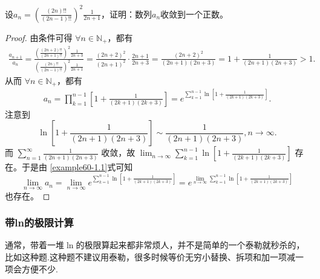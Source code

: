 \documentclass[lang=cn,newtx,10pt,scheme=chinese]{elegantbook}
\begin{document}
\begin{example}
设\(a_n=\left(\frac{(2n)!!}{(2n - 1)!!}\right)^2\frac{1}{2n + 1}\)，证明：数列\(a_n\)收敛到一个正数。
\end{example}
\begin{proof}
由条件可得 \(\forall n\in \mathbb{N}_+\)，都有
\begin{align*}
\frac{a_{n+1}}{a_n}=\frac{\left( \frac{(2n+2)!!}{(2n+1)!!} \right) ^2\frac{1}{2n+3}}{\left( \frac{(2n)!!}{(2n-1)!!} \right) ^2\frac{1}{2n+1}}=\frac{\left( 2n+2 \right) ^2}{\left( 2n+1 \right) ^2}\cdot \frac{2n+1}{2n+3}=\frac{\left( 2n+2 \right) ^2}{\left( 2n+1 \right) \left( 2n+3 \right)}=1+\frac{1}{\left( 2n+1 \right) \left( 2n+3 \right)}>1.
\end{align*}
从而 \(\forall n\in \mathbb{N}_+\)，都有
\begin{align}
a_n=\prod_{k = 1}^{n - 1}\left[1+\frac{1}{(2k + 1)(2k + 3)}\right]=e^{\sum\limits_{k = 1}^{n - 1}\ln\left[1+\frac{1}{(2k + 1)(2k + 3)}\right]}. \label{example60-1.1}
\end{align}
注意到
\[
\ln\left[1+\frac{1}{(2n + 1)(2n + 3)}\right]\sim\frac{1}{(2n + 1)(2n + 3)},n\rightarrow\infty.
\]
而 \(\sum_{n = 1}^{\infty}\frac{1}{(2n + 1)(2n + 3)}\) 收敛，故 \(\lim_{n\rightarrow\infty}\sum_{k = 1}^{n - 1}\ln\left[1+\frac{1}{(2k + 1)(2k + 3)}\right]\) 存在。于是由 \eqref{example60-1.1}式可知
\[
\lim_{n\rightarrow\infty}a_n=\lim_{n\rightarrow\infty}e^{\sum\limits_{k = 1}^{n - 1}\ln\left[1+\frac{1}{(2k + 1)(2k + 3)}\right]}=e^{\lim\limits_{n\rightarrow\infty}\sum\limits_{k = 1}^{n - 1}\ln\left[1+\frac{1}{(2k + 1)(2k + 3)}\right]}
\]
也存在。
\end{proof}


\subsubsection{带ln的极限计算}
通常，带着一堆\(\ln\)的极限算起来都非常烦人，并不是简单的一个泰勒就秒杀的，比如这种题.这种题不建议用泰勒，很多时候等价无穷小替换、拆项和加一项减一项会方便不少.
\end{document}
